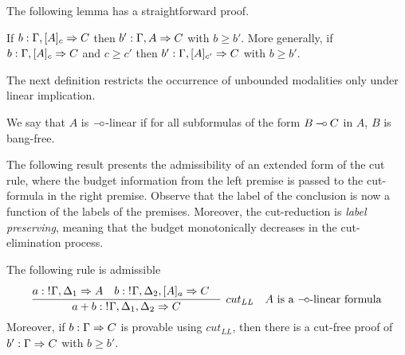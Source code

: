 The following lemma has a straightforward proof.
\begin{lemma}
If $b:\Gamma, [A]_c \Rightarrow C$ then 
$b': \Gamma, A \Rightarrow C$
with $b \geq b'$. More generally,  if $b:\Gamma, [A]_c \Rightarrow C$ and $c \geq c'$ then
$b':\Gamma, [A]_{c'} \Rightarrow C$ with $b \geq b'$. 
\end{lemma}
The next definition restricts the occurrence of unbounded modalities 
only under linear implication.
\begin{definition}
We say that $A$ is  $\mathbin{-\hspace{-0.70mm}\circ}$-linear if for all subformulas of the form $B \mathbin{-\hspace{-0.70mm}\circ} C$ in $A$, $B$ is bang-free.
\end{definition}
The following result presents the admissibility of an extended form of the cut rule, where the budget information from the left premise is passed to the cut-formula in the right premise. Observe that the label
of the conclusion is now a function of the labels of the premises. Moreover, the cut-reduction is {\em label preserving}, meaning that the budget monotonically decreases in the cut-elimination process.
\begin{theorem}
The following rule is admissible
$$
\infer[cut_{LL}\mbox{\quad $A$ is a $\limp$-linear formula}]{a+b: \nbang{}\Gamma,\Delta_1,\Delta_2 \seq C}{
 \deduce{a:\nbang{}\Gamma,\Delta_1 \seq A}{}&
 \deduce{b:\nbang{}\Gamma,\Delta_2, [A]_a \seq C}{}&
}
$$
Moreover, if $b: \Gamma \Rightarrow C$ is provable using $cut_{LL}$, then there is a cut-free proof of 
$b': \Gamma \Rightarrow C$ with $b\geq b'$.

\end{theorem}

